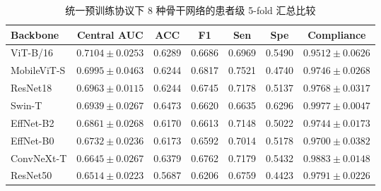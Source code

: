 \begin{table}[H]
\centering
\caption{统一预训练协议下 8 种骨干网络的患者级 5-fold 汇总比较}
\label{tab:backbone_compare}
\small
\begin{tabular}{lcccccc}
\toprule
Backbone & Central AUC & ACC & F1 & Sen & Spe & Compliance \\
\midrule
ViT-B/16 & $\mathbf{0.7104\pm0.0253}$ & 0.6289 & 0.6686 & 0.6969 & 0.5490 & $0.9512\pm0.0626$ \\
MobileViT-S & $0.6995\pm0.0463$ & 0.6244 & 0.6817 & 0.7521 & 0.4740 & $0.9746\pm0.0268$ \\
ResNet18 & $0.6963\pm0.0115$ & 0.6244 & 0.6745 & 0.7178 & 0.5137 & $0.9768\pm0.0317$ \\
Swin-T & $0.6939\pm0.0267$ & 0.6473 & 0.6620 & 0.6635 & 0.6296 & $\mathbf{0.9977\pm0.0047}$ \\
EffNet-B2 & $0.6861\pm0.0268$ & 0.6170 & 0.6613 & 0.7148 & 0.5022 & $0.9744\pm0.0173$ \\
EffNet-B0 & $0.6732\pm0.0236$ & 0.6173 & 0.6592 & 0.7014 & 0.5178 & $0.9700\pm0.0382$ \\
ConvNeXt-T & $0.6645\pm0.0267$ & 0.6379 & 0.6762 & 0.7179 & 0.5432 & $0.9883\pm0.0148$ \\
ResNet50 & $0.6514\pm0.0223$ & 0.5687 & 0.6206 & 0.6759 & 0.4423 & $0.9791\pm0.0226$ \\
\bottomrule
\end{tabular}
\end{table}
